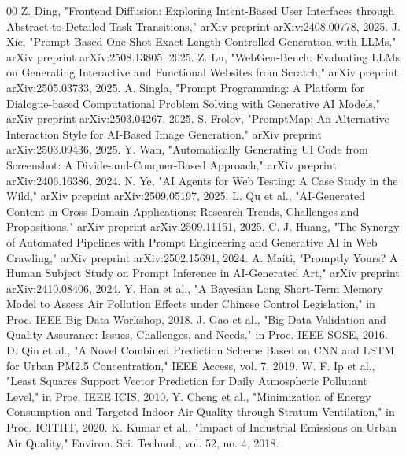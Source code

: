 \documentclass[10pt, conference, letterpaper]{IEEEtran}
\begin{document}
\begin{thebibliography}{00}
 Z. Ding, "Frontend Diffusion: Exploring Intent-Based User Interfaces through Abstract-to-Detailed Task Transitions," arXiv preprint arXiv:2408.00778, 2025.
 J. Xie, "Prompt-Based One-Shot Exact Length-Controlled Generation with LLMs," arXiv preprint arXiv:2508.13805, 2025.
 Z. Lu, "WebGen-Bench: Evaluating LLMs on Generating Interactive and Functional Websites from Scratch," arXiv preprint arXiv:2505.03733, 2025.
 A. Singla, "Prompt Programming: A Platform for Dialogue-based Computational Problem Solving with Generative AI Models," arXiv preprint arXiv:2503.04267, 2025.
 S. Frolov, "PromptMap: An Alternative Interaction Style for AI-Based Image Generation," arXiv preprint arXiv:2503.09436, 2025.
 Y. Wan, "Automatically Generating UI Code from Screenshot: A Divide-and-Conquer-Based Approach," arXiv preprint arXiv:2406.16386, 2024.
 N. Ye, "AI Agents for Web Testing: A Case Study in the Wild," arXiv preprint arXiv:2509.05197, 2025.
 L. Qu et al., "AI-Generated Content in Cross-Domain Applications: Research Trends, Challenges and Propositions," arXiv preprint arXiv:2509.11151, 2025.
 C. J. Huang, "The Synergy of Automated Pipelines with Prompt Engineering and Generative AI in Web Crawling," arXiv preprint arXiv:2502.15691, 2024.
 A. Maiti, "Promptly Yours? A Human Subject Study on Prompt Inference in AI-Generated Art," arXiv preprint arXiv:2410.08406, 2024.
 Y. Han et al., "A Bayesian Long Short-Term Memory Model to Assess Air Pollution Effects under Chinese Control Legislation," in Proc. IEEE Big Data Workshop, 2018.
 J. Gao et al., "Big Data Validation and Quality Assurance: Issues, Challenges, and Needs," in Proc. IEEE SOSE, 2016.
 D. Qin et al., "A Novel Combined Prediction Scheme Based on CNN and LSTM for Urban PM2.5 Concentration," IEEE Access, vol. 7, 2019.
 W. F. Ip et al., "Least Squares Support Vector Prediction for Daily Atmospheric Pollutant Level," in Proc. IEEE ICIS, 2010.
 Y. Cheng et al., "Minimization of Energy Consumption and Targeted Indoor Air Quality through Stratum Ventilation," in Proc. ICITIIT, 2020.
 K. Kumar et al., "Impact of Industrial Emissions on Urban Air Quality," Environ. Sci. Technol., vol. 52, no. 4, 2018.

\end{thebibliography}
\end{document}
